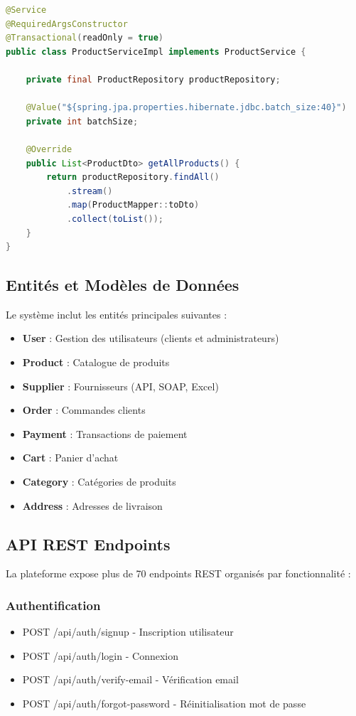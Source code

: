 \documentclass[12pt,a4paper]{report}
\begin{document}
\begin{lstlisting}[language=Java, caption=Exemple de service Spring Boot]
@Service
@RequiredArgsConstructor
@Transactional(readOnly = true)
public class ProductServiceImpl implements ProductService {
    
    private final ProductRepository productRepository;
    
    @Value("${spring.jpa.properties.hibernate.jdbc.batch_size:40}")
    private int batchSize;
    
    @Override
    public List<ProductDto> getAllProducts() {
        return productRepository.findAll()
            .stream()
            .map(ProductMapper::toDto)
            .collect(toList());
    }
}
\end{lstlisting}

\subsection{Entités et Modèles de Données}

Le système inclut les entités principales suivantes :

\begin{itemize}
    \item \textbf{User} : Gestion des utilisateurs (clients et administrateurs)
    \item \textbf{Product} : Catalogue de produits
    \item \textbf{Supplier} : Fournisseurs (API, SOAP, Excel)
    \item \textbf{Order} : Commandes clients
    \item \textbf{Payment} : Transactions de paiement
    \item \textbf{Cart} : Panier d'achat
    \item \textbf{Category} : Catégories de produits
    \item \textbf{Address} : Adresses de livraison
\end{itemize}

\subsection{API REST Endpoints}

La plateforme expose plus de 70 endpoints REST organisés par fonctionnalité :

\subsubsection{Authentification}
\begin{itemize}
    \item POST /api/auth/signup - Inscription utilisateur
    \item POST /api/auth/login - Connexion
    \item POST /api/auth/verify-email - Vérification email
    \item POST /api/auth/forgot-password - Réinitialisation mot de passe
\end{itemize}
\end{document}
